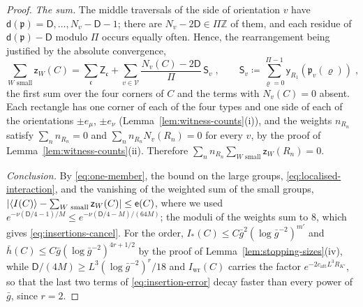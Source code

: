 \documentclass[11pt]{preprint}
\DeclarePairedDelimiter{\abs}{\lvert}{\rvert}
\numberwithin{equation}{section}
\theoremstyle{definition}
\theoremstyle{remark}
\theoremstyle{plain}
\begin{document}
\begin{proof}
\emph{The sum.} The middle traversals of the side of orientation $v$ have $\mathsf d(\mathfrak p) = \mathsf D, \dots, N_v - \mathsf D - 1$; there are $N_v - 2\mathsf D \in \Pi\mathbb Z$ of them, and each residue of $\mathsf d(\mathfrak p) - \mathsf D$ modulo $\Pi$ occurs equally often. Hence, the rearrangement being justified by the absolute convergence,
\begin{equation}\label{eq:small-sum}
    \sum_{W \text{ small}}\mathsf z_W(C) = \sum_{\mathfrak c}\mathsf Z_{\mathfrak c} + \sum_{v \in \mathcal V}\frac{N_v(C) - 2\mathsf D}{\Pi}\,\mathsf S_v\;,
    \qquad
    \mathsf S_v \coloneqq \sum_{\varrho=0}^{\Pi-1}\mathsf y_{R_1}(\mathfrak p_v(\varrho))\;,
\end{equation}
the first sum over the four corners of $C$ and the terms with $N_v(C) = 0$ absent. Each rectangle has one corner of each of the four types and one side of each of the orientations $\pm e_\mu$, $\pm e_\nu$ (Lemma~\ref{lem:witness-counts}(i)), and the weights $n_{R_n}$ satisfy $\sum_nn_{R_n} = 0$ and $\sum_nn_{R_n}N_v(R_n) = 0$ for every $v$, by the proof of Lemma~\ref{lem:witness-counts}(ii). Therefore $\sum_nn_{R_n}\sum_{W \text{ small}}\mathsf z_W(R_n) = 0$.

\emph{Conclusion.} By \eqref{eq:one-member}, the bound on the large groups, \eqref{eq:localised-interaction}, and the vanishing of the weighted sum of the small groups, $\abs{\langle I(C)\rangle - \sum_{W \text{ small}}\mathsf z_W(C)} \leq \mathsf e(C)$, where we used $e^{-\nu(\mathsf D/4 - 1)/M} \leq e^{-\nu(\mathsf D/4 - M)/(64M)}$; the moduli of the weights sum to $8$, which gives \eqref{eq:insertions-cancel}. For the order, $I_*(C) \leq C\bar g^2(\log\bar g^{-2})^{m'}$ and $\bar h(C) \leq C\bar g(\log\bar g^{-2})^{4r+1/2}$ by the proof of Lemma~\ref{lem:stopping-sizes}(iv), while $\mathsf D/(4M) \geq L^3(\log\bar g^{-2})^r/18$ and $I_{\mathrm{wr}}(C)$ carries the factor $e^{-2c_{\mathrm{att}}L^3R_{K'}}$, so that the last two terms of \eqref{eq:insertion-error} decay faster than every power of $\bar g$, since $r = 2$.
\end{proof}
\end{document}
